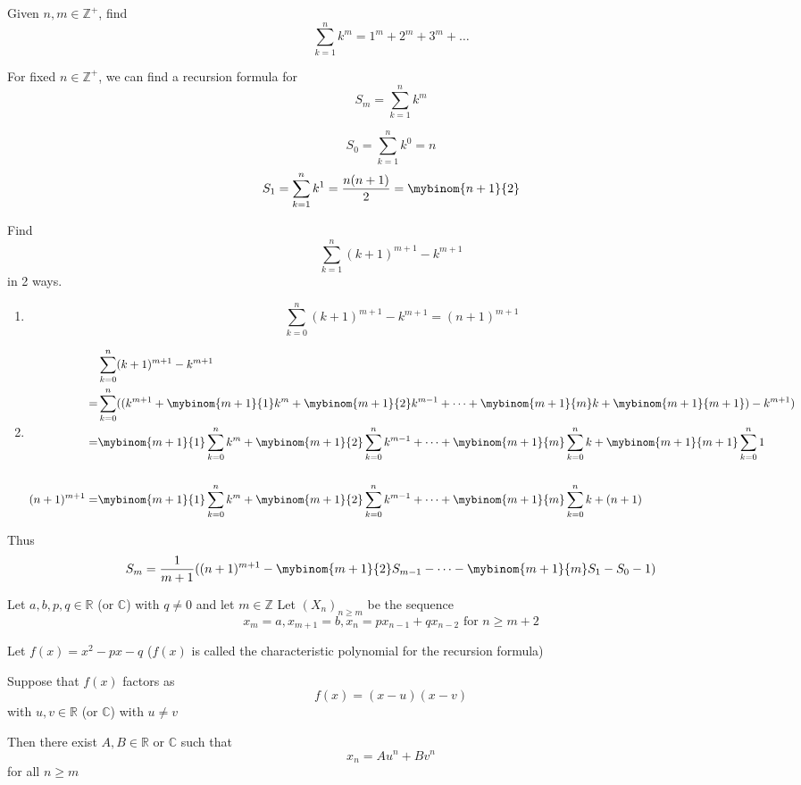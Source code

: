 
\begin{exmp}
Given $n,m\in\mathbb{Z}^+$, find \[\sum_{k=1}^n k^m = 1^m+2^m+3^m+\dots\]
\end{exmp}

\begin{solution}
For fixed $n\in \mathbb{Z}^+$, we can find a recursion formula for \[S_m = \sum_{k=1}^n k^m\]

\[S_0 = \sum_{k=1}^n k^0 = n\]
\[S_1 = \sum_{k=1}^n k^1 = \frac{n(n+1)}{2} = \mybinom{n+1}{2}\]

Find \[\sum_{k=1}^n (k+1)^{m+1} - k^{m+1}\] in 2 ways.

\begin{enumerate}
\item
\[\sum_{k=0}^n (k+1)^{m+1} - k^{m+1} = (n+1)^{m+1}\]

\item
\begin{align*}
    &\sum_{k=0}^n (k+1)^{m+1} - k^{m+1} \\
    = & \sum_{k=0}^n ((k^{m+1} + \mybinom{m+1}{1}k^m +  \mybinom{m+1}{2}k^{m-1} + \dots + \mybinom{m+1}{m} k + \mybinom{m+1}{m+1}) - k^{m+1})\\
    =&\mybinom{m+1}{1} \sum_{k=0}^n k^m + \mybinom{m+1}{2} \sum_{k=0}^n k^{m-1} + \dots + \mybinom{m+1}{m} \sum_{k=0}^n k + \mybinom{m+1}{m+1}  \sum_{k=0}^n 1 \\
    \\
    (n+1)^{m+1} = & \mybinom{m+1}{1} \sum_{k=0}^n k^m  + \mybinom{m+1}{2} \sum_{k=0}^n k^{m-1} + \dots + \mybinom{m+1}{m} \sum_{k=0}^n  k + (n+1) \\
\end{align*}

\end{enumerate}

Thus \[S_m = \frac{1}{m+1} ((n+1)^{m+1} - \mybinom{m+1}{2} S_{m-1} - \dots - \mybinom{m+1}{m} S_1 - S_0 - 1)\]
\end{solution}


\begin{thm}
Let $a,b,p,q\in\mathbb{R}$ (or $\mathbb{C}$) with $q\neq 0$ and let $m\in\mathbb{Z}$
Let $(X_n)_{n\geq m}$ be the sequence 
\[x_m = a, x_{m+1} = b, x_n = px_{n-1}+qx_{n-2} \text{ for } n\geq m+2\]

Let $f(x) = x^2 - px - q$ ($f(x)$ is called the characteristic polynomial for the recursion formula)

Suppose that $f(x)$ factors as \[f(x) = (x-u)(x-v)\]
with $u,v\in\mathbb{R}$ (or $\mathbb{C}$) with $u\neq v$

Then there exist $A,B\in \mathbb{R}$ or $\mathbb{C}$ such that 
\[x_n = Au^n + Bv^n\] for all $n\geq m$
\end{thm}

